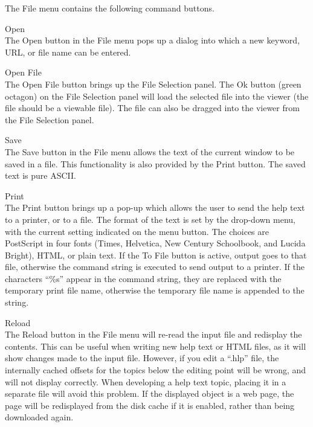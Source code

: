The {\cb File} menu contains the following command buttons.
\begin{description}
\item{\cb Open}\\
The {\cb Open} button in the {\cb File} menu pops up a dialog into
which a new keyword, URL, or file name can be entered.

\item{\cb Open File}\\
The {\cb Open File} button brings up the {\cb File Selection} panel. 
The {\cb Ok} button (green octagon) on the {\cb File Selection} panel
will load the selected file into the viewer (the file should be a
viewable file).  The file can also be dragged into the viewer from the
{\cb File Selection} panel.

\item{\cb Save}\\
The {\cb Save} button in the {\cb File} menu allows the text of the
current window to be saved in a file.  This functionality is also
provided by the {\cb Print} button.  The saved text is pure ASCII.

\item{\cb Print}\\
The {\cb Print} button brings up a pop-up which allows the user to
send the help text to a printer, or to a file.  The format of the text
is set by the drop-down menu, with the current setting indicated on
the menu button.  The choices are PostScript in four fonts (Times,
Helvetica, New Century Schoolbook, and Lucida Bright), HTML, or plain
text.  If the {\cb To File} button is active, output goes to that
file, otherwise the command string is executed to send output to a
printer.  If the characters ``{\vt \%s}'' appear in the command
string, they are replaced with the temporary print file name,
otherwise the temporary file name is appended to the string.

\item{\cb Reload}\\
The {\cb Reload} button in the {\cb File} menu will re-read the input
file and redisplay the contents.  This can be useful when writing new
help text or HTML files, as it will show changes made to the input
file.  However, if you edit a ``{\vt .hlp}'' file, the internally
cached offsets for the topics below the editing point will be wrong,
and will not display correctly.  When developing a help text topic,
placing it in a separate file will avoid this problem.  If the
displayed object is a web page, the page will be redisplayed from the
disk cache if it is enabled, rather than being downloaded again.


\end{description}
